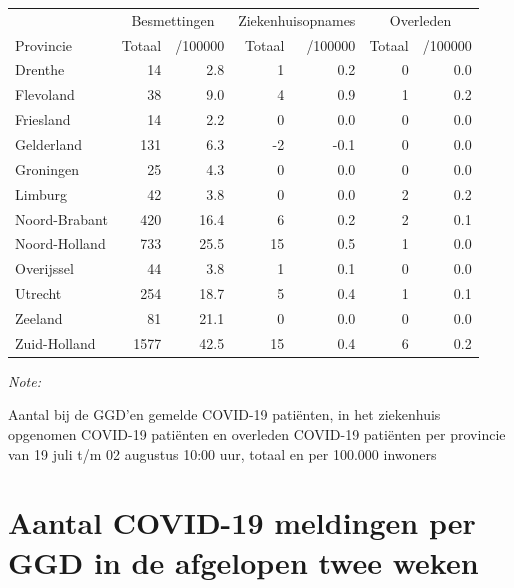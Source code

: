 \documentclass[
  english,
  man,floatsintext]{apa6}
\begin{document}
\begin{table}[H]
\centering
\begin{threeparttable}
\begin{tabular}{lrrrrrr}
\toprule
\multicolumn{1}{c}{ } & \multicolumn{2}{c}{Besmettingen} & \multicolumn{2}{c}{Ziekenhuisopnames} & \multicolumn{2}{c}{Overleden} \\
\cmidrule(l{3pt}r{3pt}){2-3} \cmidrule(l{3pt}r{3pt}){4-5} \cmidrule(l{3pt}r{3pt}){6-7}
Provincie & Totaal & /100000 & Totaal & /100000 & Totaal & /100000\\
\midrule
Drenthe & 14 & 2.8 & 1 & 0.2 & 0 & 0.0\\
Flevoland & 38 & 9.0 & 4 & 0.9 & 1 & 0.2\\
Friesland & 14 & 2.2 & 0 & 0.0 & 0 & 0.0\\
Gelderland & 131 & 6.3 & -2 & -0.1 & 0 & 0.0\\
Groningen & 25 & 4.3 & 0 & 0.0 & 0 & 0.0\\
Limburg & 42 & 3.8 & 0 & 0.0 & 2 & 0.2\\
Noord-Brabant & 420 & 16.4 & 6 & 0.2 & 2 & 0.1\\
Noord-Holland & 733 & 25.5 & 15 & 0.5 & 1 & 0.0\\
Overijssel & 44 & 3.8 & 1 & 0.1 & 0 & 0.0\\
Utrecht & 254 & 18.7 & 5 & 0.4 & 1 & 0.1\\
Zeeland & 81 & 21.1 & 0 & 0.0 & 0 & 0.0\\
Zuid-Holland & 1577 & 42.5 & 15 & 0.4 & 6 & 0.2\\
\bottomrule
\end{tabular}
\begin{tablenotes}
\item \textit{Note: } 
\item Aantal bij de GGD’en gemelde COVID-19 patiënten, in het ziekenhuis opgenomen COVID-19 patiënten en overleden COVID-19 patiënten per provincie van 19 juli t/m 02 augustus 10:00 uur, totaal en per 100.000 inwoners
\end{tablenotes}
\end{threeparttable}
\end{table}

\newpage

\hypertarget{aantal-covid-19-meldingen-per-ggd-in-de-afgelopen-twee-weken}{%
\section{Aantal COVID-19 meldingen per GGD in de afgelopen twee weken}\label{aantal-covid-19-meldingen-per-ggd-in-de-afgelopen-twee-weken}}
\end{document}
